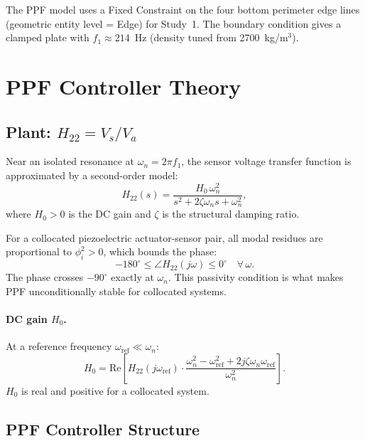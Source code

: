 \documentclass[12pt,a4paper]{article}
\begin{document}
The PPF model uses a Fixed Constraint on the four bottom perimeter edge lines
(geometric entity level = Edge) for Study~1.  The boundary condition gives a
clamped plate with $f_1 \approx 214$~Hz (density tuned from 2700~kg/m$^3$).

\section{PPF Controller Theory}
\label{sec:ppf}

\subsection{Plant: \texorpdfstring{$H_{22} = V_s/V_a$}{H22 = Vs/Va}}
\label{sec:ppf_plant}

Near an isolated resonance at $\omega_n = 2\pi f_1$, the sensor voltage transfer
function is approximated by a second-order model:
\begin{equation}
  H_{22}(s) = \frac{H_0\,\omega_n^2}{s^2 + 2\zeta\omega_n s + \omega_n^2},
  \label{eq:H22ppf}
\end{equation}
where $H_0 > 0$ is the DC gain and $\zeta$ is the structural damping ratio.

For a collocated piezoelectric actuator-sensor pair, all modal residues are
proportional to $\phi_i^2 > 0$, which bounds the phase:
\begin{equation}
  -180^\circ \leq \angle H_{22}(j\omega) \leq 0^\circ \quad \forall\,\omega.
  \label{eq:ppf_phase_bound}
\end{equation}
The phase crosses $-90^\circ$ exactly at $\omega_n$.  This passivity condition
is what makes PPF unconditionally stable for collocated systems.

\paragraph{DC gain $H_0$.}
At a reference frequency $\omega_\text{ref} \ll \omega_n$:
\begin{equation}
  H_0 = \mathrm{Re}\!\left[
    H_{22}(j\omega_\text{ref})
    \cdot
    \frac{\omega_n^2 - \omega_\text{ref}^2 + 2j\zeta\omega_n\omega_\text{ref}}
         {\omega_n^2}
  \right].
\end{equation}
$H_0$ is real and positive for a collocated system.

\subsection{PPF Controller Structure}
\label{sec:ppf_ctrl}
\end{document}
